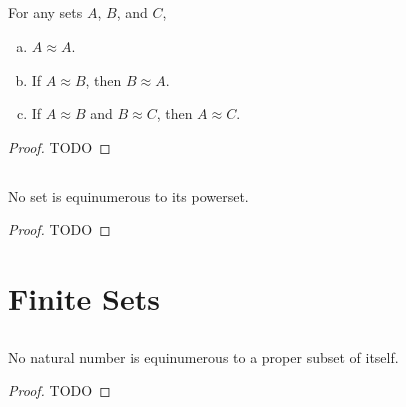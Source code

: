 \documentclass{report}
\begin{document}
\subsection{}%

  \begin{theorem}[6A]
    For any sets $A$, $B$, and $C$,
      \begin{enumerate}[(a)]
        \item $A \approx A$.
        \item If $A \approx B$, then $B \approx A$.
        \item If $A \approx B$ and $B \approx C$, then $A \approx C$.
      \end{enumerate}
  \end{theorem}

  \begin{proof}
    TODO
  \end{proof}

\subsection{}%

  \begin{theorem}[6B]
    No set is equinumerous to its powerset.
  \end{theorem}

  \begin{proof}
    TODO
  \end{proof}

\section{Finite Sets}%

\subsection{}%

  \begin{theorem}
    No natural number is equinumerous to a proper subset of itself.
  \end{theorem}

  \begin{proof}
    TODO
  \end{proof}

\subsection{}%
\end{document}
